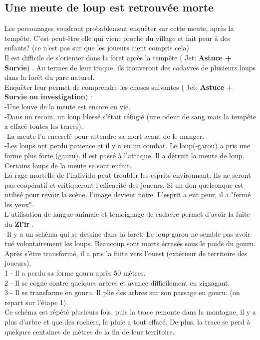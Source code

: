 \documentclass[oneside,12pt]{book}
\newcommand\roll[1]{
( Jet: \textbf{#1})
}
\newcommand{\Thomas}{\textbf{Zi'ir} }
\begin{document}
\begin{flushleft}
\section{Une meute de loup est retrouvée morte}
\label{MeuteMorte}
Les personnages voudront probablement enquêter sur cette meute, après la tempête. C'est peut-être elle qui vient proche du village et fait peur à des enfants? (ce n'est pas sur que les joueurs aient compris cela) \\
Il est difficile de s'orienter dans la foret après la tempête \roll{Astuce + Survie}. Au termes de leur traque, ils trouveront des cadavres de plusieurs loups dans la forêt du parc naturel. \\
Enquêter leur permet de comprendre les choses suivantes \roll{Astuce + Survie ou investigation} : \\
-Une louve de la meute est encore en vie.\\
-Dans un recoin, un loup blessé s'était réfugié (une odeur de sang mais la tempête a effacé toutes les traces).\\ 
-La meute l'a encerclé pour attendre sa mort avant de le manger.\\
-Les loups ont perdu patience et il y a eu un combat. Le loup(-garou) a pris une forme plus forte (gauru). 
il est passé à l'attaque. Il a détruit la meute de loup. Certains loups de la meute se sont enfuit. \\
La rage mortelle de l'individu peut troubler les esprits environnant. Ils ne seront pas coopératif et critiqueront l'efficacité des joueurs. Si un don quelconque est utilisé pour revoir la scène, l'image devient noire. L'esprit a eut peur, il a "fermé les yeux".\\
L'utilisation de langue animale et témoignage de cadavre permet d'avoir la fuite du \Thomas.\\
-Il y a un schéma qui se dessine dans la foret. Le loup-garou ne semble pas avoir tué volontairement les loups. Beaucoup sont morts écrasés sous le poids du gouru. Après s’être transformé, il a pris la fuite vers l'ouest (extérieur de territoire des joueurs). \\
1 - Il a perdu sa forme gouru après 50 mètres.\\
2 - Il se cogne contre quelques arbres et avance difficilement en zigzagant.\\
3 - Il se transforme en gouru. Il plie des arbres sur son passage en gouru. (on repart sur l'étape 1).\\
Ce schéma est répété plusieurs fois, puis la trace remonte dans la montagne, il y a plus d'arbre et que des rochers, la pluie a tout effacé. De plus, la trace se perd à quelques centaines de mètres de la fin de leur territoire.\\


\end{flushleft}
\end{document}
